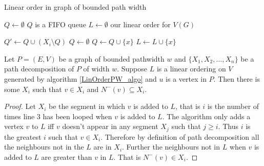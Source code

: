 \begin{algorithm}[h]
    \caption{Linear order in graph of bounded path width}
    \label{LinOrderPW_algo}
    \begin{algorithmic}[1]
        
        \State $Q \gets \emptyset$ \Comment $Q$ is a FIFO queue
        \State $L \gets \emptyset$ \Comment our linear order for $V(G)$
       
            \State $Q' \gets Q \cup (X_i\setminus Q)$
            \State $Q \gets \emptyset$
                    \State $Q \gets Q\cup \{x\}$
                \Else 
                    \State $L \gets L\cup \{x\}$   
                \EndIf    
        \EndFor
       
        \EndFor 
        
    \end{algorithmic}
\end{algorithm}

\begin{lemma} \label{neighboursAfter}
    Let $P=(E,V)$ be a graph of bounded pathwidth $w$ and $\{X_1,X_2,\dots,X_n\}$ be a path decomposition of $P$ of width $w$.
    Suppose $L$ is a linear ordering on $V$ generated by algorithm \ref*{LinOrderPW_algo} and $u$ is a vertex in $P$. Then there is some $X_i$ such that $v\in X_i$ and $N^-(v) \subseteq X_i$.
\end{lemma}

\begin{proof}
    Let $X_i$ be the segment in which $v$ is added to $L$, that is $i$ is the number of times line 3 has been looped when $v$ is added to $L$.  
    The algorithm only adds a vertex $v$ to $L$ iff $v$ doesn't appear in any segment $X_j$ such that $j \geq i$. Thus $i$ is the greatest $i$ such that $v \in X_i$. Therefore by definition of path decomposition all the neighbours not in the $L$ are in $X_i$. Further the neighbours not in $L$ when $v$ is added to $L$ are greater than $v$ in $L$. That is $N^-(v) \in X_i$.
\end{proof}

